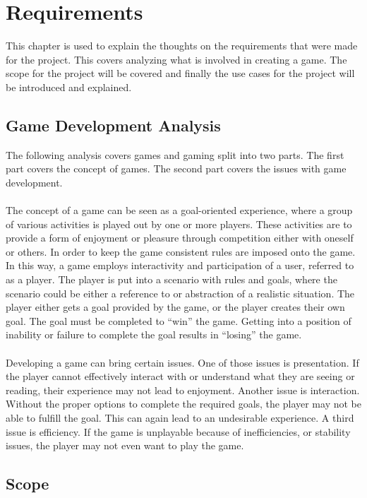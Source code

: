 
\section{Requirements}

This chapter is used to explain the thoughts on the requirements that
 were made for the project. This covers analyzing what is involved in creating
  a game. The scope for the project will be covered and finally the use cases
   for the project will be introduced and explained.

\subsection{Game Development Analysis}

The following analysis covers games and gaming split into two parts.
The first part covers the concept of games. The second part covers the
issues with game development.\\\\
The concept of a game can be seen as a goal-oriented experience,
where a group of various activities is played out by one or more players.
These activities are to provide a form of enjoyment or pleasure through
 competition either with oneself or others. In order to keep the game
  consistent rules are imposed onto the game.
In this way, a game employs interactivity and participation of a user,
referred to as a player. The player is put into a scenario with rules and
 goals, where the scenario could be either a reference to or abstraction of
  a realistic situation. The player either gets a goal provided by the game,
   or the player creates their own goal. The goal must be completed to “win”
    the game. Getting into a position of inability or failure to complete the
     goal results in “losing” the game.\\\\
Developing a game can bring certain issues. One of those issues is
 presentation. If the player cannot effectively interact with or understand
  what they are seeing or reading, their experience may not lead to enjoyment.
   Another issue is interaction. Without the proper options to complete the
    required goals, the player may not be able to fulfill the goal. This can
     again lead to an undesirable experience. A third issue is efficiency. If
      the game is unplayable because of inefficiencies, or stability issues,
       the player may not even want to play the game.

\subsection{Scope}

